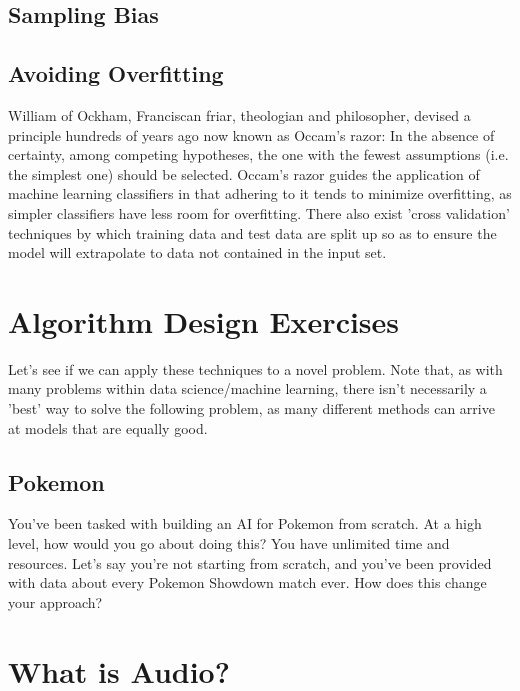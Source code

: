 \documentclass[11pt]{article}
\begin{document}
\subsection{Sampling Bias}
\subsection{Avoiding Overfitting}
William of Ockham, Franciscan friar, theologian and philosopher, devised a principle hundreds of years ago now known as Occam's razor: In the absence of certainty, among competing hypotheses, the one with the fewest assumptions (i.e. the simplest one) should be selected. Occam's razor guides the application of machine learning classifiers in that adhering to it tends to minimize overfitting, as simpler classifiers have less room for overfitting. There also exist 'cross validation' techniques by which training data and test data are split up so as to ensure the model will extrapolate to data not contained in the input set.

\section{Algorithm Design Exercises}
Let's see if we can apply these techniques to a novel problem. Note that, as with many problems within data science/machine learning, there isn't necessarily a 'best' way to solve the following problem, as many different methods can arrive at models that are equally good.
\subsection{Pokemon}
You've been tasked with building an AI for Pokemon from scratch. At a high level, how would you go about doing this? You have unlimited time and resources. 
Let's say you're not starting from scratch, and you've been provided with data about every Pokemon Showdown match ever. How does this change your approach?

\section{What is Audio?}
\end{document}
